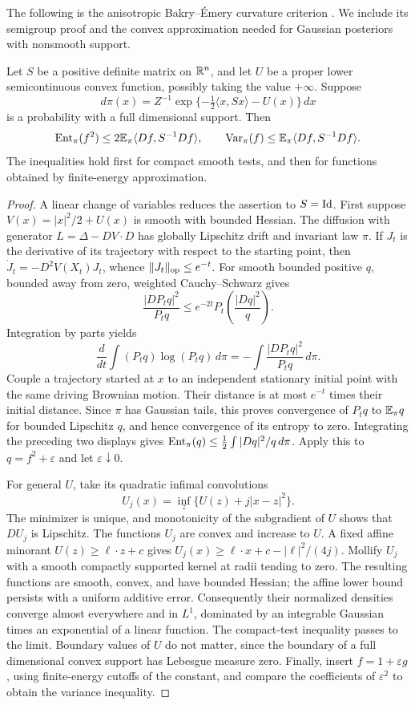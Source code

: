 The following is the anisotropic Bakry--\'Emery curvature criterion
\cite{BakryEmery1985}.  We include its semigroup proof and the convex
approximation needed for Gaussian posteriors with nonsmooth support.

\begin{lemma}\label{lem:curvature}
Let $S$ be a positive definite matrix on $\mathbb R^n$, and let $U$ be a
proper lower semicontinuous convex function, possibly taking the value
$+\infty$. Suppose
\[
 d\pi(x)=Z^{-1}\exp\{-\tfrac12\langle x,Sx\rangle-U(x)\}\,dx
\]
is a probability with a full dimensional support. Then
\[
 \operatorname{Ent}_\pi(f^2)\le2\mathbb E_\pi\langle Df,S^{-1}Df\rangle,
 \qquad
 \operatorname{Var}_\pi(f)\le\mathbb E_\pi\langle Df,S^{-1}Df\rangle.
\]
The inequalities hold first for compact smooth tests, and then for
functions obtained by finite-energy approximation.
\end{lemma}

\begin{proof}
A linear change of variables reduces the assertion to $S=\mathrm{Id}$.
First suppose $V(x)=|x|^2/2+U(x)$ is smooth with bounded Hessian.
The diffusion with generator $L=\Delta-DV\cdot D$ has globally
Lipschitz drift and invariant law $\pi$. If $J_t$ is the derivative
of its trajectory with respect to the starting point, then
$\dot J_t=-D^2V(X_t)J_t$, whence $\|J_t\|_{\mathrm{op}}\le e^{-t}$.
For smooth bounded positive $q$, bounded away from zero,
weighted Cauchy--Schwarz gives
\[
 \frac{|DP_tq|^2}{P_tq}
 \le e^{-2t}P_t\left(\frac{|Dq|^2}{q}\right).
\]
Integration by parts yields
\[
 \frac{d}{dt}\int (P_tq)\log(P_tq)\,d\pi
 =-\int\frac{|DP_tq|^2}{P_tq}\,d\pi.
\]
Couple a trajectory started at $x$ to an independent stationary
initial point with the same driving Brownian motion. Their distance
is at most $e^{-t}$ times their initial distance. Since $\pi$ has
Gaussian tails, this proves convergence of $P_tq$ to $\mathbb E_\pi q$
for bounded Lipschitz $q$, and hence convergence of its entropy to
zero. Integrating the preceding two displays gives
$\operatorname{Ent}_\pi(q)\le\frac12\int|Dq|^2/q\,d\pi$. Apply this to
$q=f^2+\varepsilon$ and let $\varepsilon\downarrow0$.

For general $U$, take its quadratic infimal convolutions
\[
 U_j(x)=\inf_z\{U(z)+j|x-z|^2\}.
\]
The minimizer is unique, and monotonicity of the subgradient of $U$
shows that $DU_j$ is Lipschitz. The functions $U_j$ are convex and
increase to $U$. A fixed affine minorant $U(z)\ge\ell\cdot z+c$
gives $U_j(x)\ge\ell\cdot x+c-|\ell|^2/(4j)$.
Mollify $U_j$ with a smooth compactly supported kernel at radii
tending to zero. The resulting functions are smooth, convex, and
have bounded Hessian; the affine lower bound persists with a
uniform additive error. Consequently their normalized densities
converge almost everywhere and in $L^1$, dominated by an integrable
Gaussian times an exponential of a linear function. The compact-test
inequality passes to the limit. Boundary values of $U$ do not matter,
since the boundary of a full dimensional convex support has
Lebesgue measure zero. Finally, insert $f=1+\varepsilon g$,
using finite-energy cutoffs of the constant, and compare the
coefficients of $\varepsilon^2$ to obtain the variance inequality.
\end{proof}

